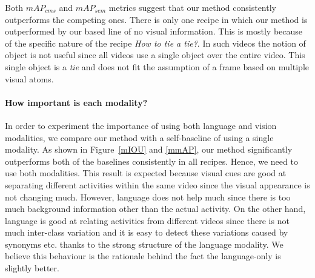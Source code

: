 \begin{table}
\caption{Semantic mean-average-precision $mAP_{sem}$ computed based on subjective evaluation.}
{\small
{}}
\normalsize
\end{table}
Both $mAP_{cms}$ and $mAP_{sem}$ metrics suggest that our method consistently outperforms the competing ones. There is only one recipe in which our method is outperformed by our based line of no visual information. This is mostly because of the specific nature of the recipe \emph{How to tie a tie?}. In such videos the notion of object is not useful since all videos use a single object over the entire video. This single object is a \emph{tie} and does not fit the assumption of a frame based on multiple visual atoms. 


\paragraph{How important is each modality?}
In order to experiment the importance of using both language and vision modalities, we compare our method with a self-baseline of using a single modality. As shown in Figure~\ref{mIOU} and \ref{mmAP}, our method significantly outperforms both of the baselines consistently in all recipes. Hence, we need to use both modalities. This result is expected because visual cues are good at separating different activities within the same video since the visual appearance is not changing much. However, language does not help much since there is too much background information other than the actual activity. On the other hand, language is good at relating activities from different videos since there is not much inter-class variation and it is easy to detect these variations caused by synonyms etc. thanks to the strong structure of the language modality. We believe this behaviour is the rationale behind the fact the language-only is slightly better.